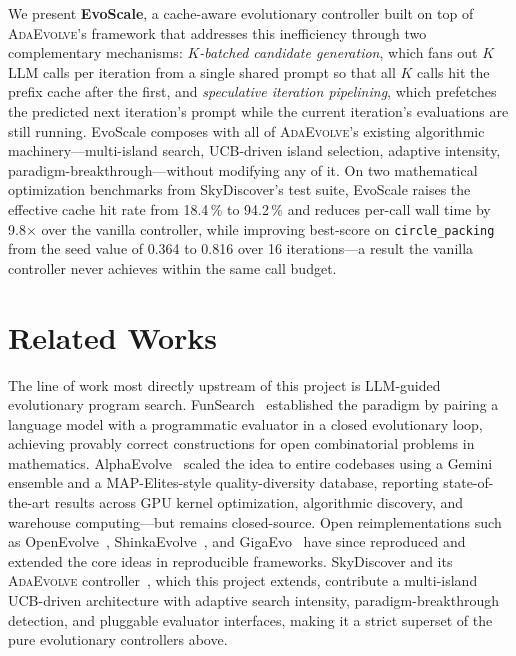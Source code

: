 \documentclass{article}
\newcommand{\adaev}{\textsc{AdaEvolve}}
\begin{document}
We present \textbf{EvoScale}, a cache-aware evolutionary controller
built on top of \adaev{}'s framework that addresses this inefficiency
through two complementary mechanisms: \emph{$K$-batched candidate
generation}, which fans out $K$ LLM calls per iteration from a single
shared prompt so that all $K$ calls hit the prefix cache after the
first, and \emph{speculative iteration pipelining}, which prefetches
the predicted next iteration's prompt while the current iteration's
evaluations are still running. EvoScale composes with all of \adaev{}'s
existing algorithmic machinery---multi-island search, UCB-driven island
selection, adaptive intensity, paradigm-breakthrough---without
modifying any of it. On two mathematical optimization benchmarks from
SkyDiscover's test suite, EvoScale raises the effective cache hit rate
from 18.4\,\% to 94.2\,\% and reduces per-call wall time by 9.8$\times$
over the vanilla controller, while improving best-score on
\texttt{circle\_packing} from the seed value of 0.364 to 0.816 over
16 iterations---a result the vanilla controller never achieves within
the same call budget.

\section{Related Works}
The line of work most directly upstream of this project is LLM-guided
evolutionary program search.
FunSearch~\cite{romeraparedes2024funsearch} established the paradigm by
pairing a language model with a programmatic evaluator in a closed
evolutionary loop, achieving provably correct constructions for open
combinatorial problems in mathematics.
AlphaEvolve~\cite{novikov2025alphaevolve} scaled the idea to entire
codebases using a Gemini ensemble and a MAP-Elites-style
quality-diversity database, reporting state-of-the-art results across
GPU kernel optimization, algorithmic discovery, and warehouse
computing---but remains closed-source.
Open reimplementations such as
OpenEvolve~\cite{rudes2025openevolve},
ShinkaEvolve~\cite{lange2025shinkaevolve}, and
GigaEvo~\cite{khrulkov2025gigaevo} have since reproduced and extended
the core ideas in reproducible frameworks.
SkyDiscover and its \adaev{} controller~\cite{cemri2026skydiscover},
which this project extends, contribute a multi-island UCB-driven
architecture with adaptive search intensity, paradigm-breakthrough
detection, and pluggable evaluator interfaces, making it a strict
superset of the pure evolutionary controllers above.
\end{document}
